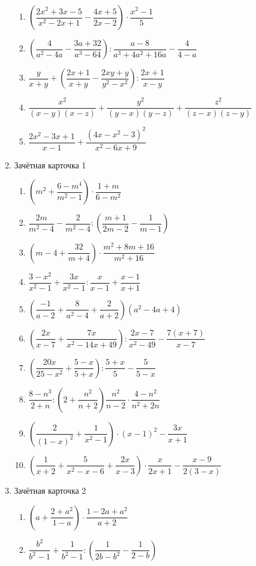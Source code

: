 \documentclass[12pt, a4paper]{article}
\begin{document}
\begin{enumerate}
\begin{enumerate}[label=\asbuk*)]
		\item \( \left( \dfrac{2x^2+3x-5}{x^2-2x+1}-\dfrac{4x+5}{2x-2} \right)\cdot\dfrac{x^2-1}{5} \)
		\item \(\left( \dfrac{4}{a^2-4a}-\dfrac{3a+32}{a^3-64} \right):\dfrac{a-8}{a^3+4a^2+16a}-\dfrac{4}{4-a}\)
		\item \( \dfrac{y}{x+y}+\left( \dfrac{2x+1}{x+y}-\dfrac{2xy+y}{y^2-x^2} \right):\dfrac{2x+1}{x-y} \)
		\item \( \dfrac{x^2}{(x-y)(x-z)}+\dfrac{y^2}{(y-x)(y-z)}+\dfrac{z^2}{(z-x)(z-y)} \)
		\item \( \dfrac{2x^2-3x+1}{x-1}+\dfrac{(4x-x^2-3)^2}{x^2-6x+9} \)
	\end{enumerate}
	\item Зачётная карточка 1
	\begin{enumerate}[label=\asbuk*)]
		\item \( \left( m^2+\dfrac{6-m^4}{m^2-1} \right) \cdot\dfrac{1+m}{6-m^2}\)
		\item \( \dfrac{2m}{m^2-4}-\dfrac{2}{m^2-4}:\left( \dfrac{m+1}{2m-2}-\dfrac{1}{m-1} \right) \)
		\item \( \left( m-4+\dfrac{32}{m+4} \right) \cdot\dfrac{m^2+8m+16}{m^2+16}\)
		\item \( \dfrac{3-x^2}{x^2-1}+\dfrac{3x}{x^2-1}:\dfrac{x}{x-1}+\dfrac{x-1}{x+1} \)
		\item \( \left( \dfrac{-1}{a-2}+\dfrac{8}{a^2-4}+\dfrac{2}{a+2} \right) (a^2-4a+4)\)
		\item \( \left( \dfrac{2x}{x-7}+ \dfrac{7x}{x^2-14x+49}\right) :\dfrac{2x-7}{x^2-49}-\dfrac{7(x+7)}{x-7}\)
		\item \( \left( \dfrac{20x}{25-x^2}+\dfrac{5-x}{5+x} \right) :\dfrac{5+x}{5}-\dfrac{5}{5-x}\)
		\item \( \dfrac{8-n^3}{2+n}:\left( 2+\dfrac{n^2}{n+2} \right) \dfrac{n^2}{n-2}\cdot\dfrac{4-n^2}{n^2+2n}\)
		\item \( \left( \dfrac{2}{(1-x)^2}+\dfrac{1}{x^2-1} \right)\cdot(x-1)^2-\dfrac{3x}{x+1} \)
		\item \( \left( \dfrac{1}{x+2}+\dfrac{5}{x^2-x-6}+\dfrac{2x}{x-3} \right)\cdot\dfrac{x}{2x+1}-\dfrac{x-9}{2(3-x)} \)
	\end{enumerate}
	\item Зачётная карточка 2
	\begin{enumerate}[label=\asbuk*)]
		\item \( \left( a+\dfrac{2+a^2}{1-a} \right)\cdot\dfrac{1-2a+a^2}{a+2} \)
		\item \( \dfrac{b^2}{b^2-1}+\dfrac{1}{b^2-1}:\left( \dfrac{1}{2b-b^2}-\dfrac{1}{2-b} \right) \)

\end{enumerate}
\end{enumerate}
\end{document}
